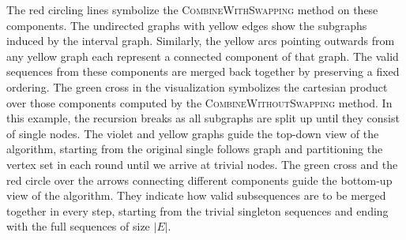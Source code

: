 The red circling lines symbolize the \textsc{CombineWithSwapping} method on these components.
The undirected graphs with yellow edges show the subgraphs induced by the interval graph.
Similarly, the yellow arcs pointing outwards from any yellow graph each represent a connected component of that graph.
The valid sequences from these components are merged back together by preserving a fixed ordering.
The green cross in the visualization symbolizes the cartesian product over those components computed by the \textsc{CombineWithoutSwapping} method.
In this example, the recursion breaks as all subgraphs are split up until they consist of single nodes.
The violet and yellow graphs guide the top-down view of the algorithm, starting from the original single follows graph and partitioning the vertex set in each round until we arrive at trivial nodes.
The green cross and the red circle over the arrows connecting different components guide the bottom-up view of the algorithm.
They indicate how valid subsequences are to be merged together in every step, starting from the trivial singleton sequences and ending with the full sequences of size $|E|$.
%
%
%
%
%
%
